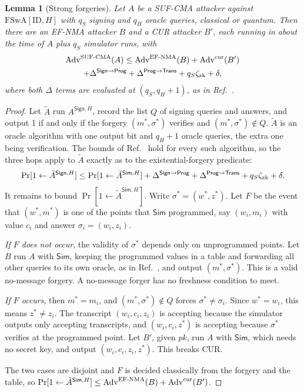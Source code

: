 \documentclass[aps,prx,reprint,superscriptaddress,nofootinbib,floatfix]{revtex4-2}
\newtheorem{lemma}{Lemma}
\theoremstyle{remark}
\newcommand{\Adv}{\mathrm{Adv}}
\newcommand{\Sign}{\textsf{Sign}}
\newcommand{\Sim}{\textsf{Sim}}
\begin{document}
\begin{lemma}[Strong forgeries]\label{lem:abstract}
Let $A$ be a SUF-CMA attacker against $\mathrm{FSwA}[\mathrm{ID},H]$ with $q_S$ signing and $q_H$ oracle queries, classical or quantum. Then there are an EF-NMA attacker $B$ and a CUR attacker $B'$, each running in about the time of $A$ plus $q_S$ simulator runs, with
\begin{multline*}
\Adv^{\rm SUF\text{-}CMA}(A)\le \Adv^{\rm EF\text{-}NMA}(B)+\Adv^{\rm cur}(B')\\
+\Delta^{\Sign\to\textsf{Prog}}+\Delta^{\textsf{Prog}\to\textsf{Trans}}+q_S\zeta_{\rm zk}+\delta,
\end{multline*}
where both $\Delta$ terms are evaluated at $(q_S,q_H+1)$, as in Ref.~\cite{fsa-fix}.
\end{lemma}
\begin{proof}
Let $\tilde A$ run $A^{\Sign,H}$, record the list $Q$ of signing queries and answers, and output 1 if and only if the forgery $(m^\ast,\sigma^\ast)$ verifies and $(m^\ast,\sigma^\ast)\notin Q$. $\tilde A$ is an oracle algorithm with one output bit and $q_H+1$ oracle queries, the extra one being verification. The bounds of Ref.~\cite{fsa-fix} hold for every such algorithm, so the three hops apply to $\tilde A$ exactly as to the existential-forgery predicate:
\[
\Pr[1\gets\tilde A^{\Sign,H}]\le\Pr[1\gets\tilde A^{\Sim,H}]+\Delta^{\Sign\to\textsf{Prog}}+\Delta^{\textsf{Prog}\to\textsf{Trans}}+q_S\zeta_{\rm zk}+\delta .
\]
It remains to bound $\Pr[1\gets\tilde A^{\Sim,H}]$. Write $\sigma^\ast=(w^\ast,z^\ast)$. Let $F$ be the event that $(w^\ast,m^\ast)$ is one of the points that $\Sim$ programmed, say $(w_i,m_i)$ with value $c_i$ and answer $\sigma_i=(w_i,z_i)$.

\emph{If $F$ does not occur}, the validity of $\sigma^\ast$ depends only on unprogrammed points. Let $B$ run $A$ with $\Sim$, keeping the programmed values in a table and forwarding all other queries to its own oracle, as in Ref.~\cite{fsa-fix}, and output $(m^\ast,\sigma^\ast)$. This is a valid no-message forgery. A no-message forger has no freshness condition to meet.

\emph{If $F$ occurs}, then $m^\ast=m_i$, and $(m^\ast,\sigma^\ast)\notin Q$ forces $\sigma^\ast\neq\sigma_i$. Since $w^\ast=w_i$, this means $z^\ast\neq z_i$. The transcript $(w_i,c_i,z_i)$ is accepting because the simulator outputs only accepting transcripts, and $(w_i,c_i,z^\ast)$ is accepting because $\sigma^\ast$ verifies at the programmed point. Let $B'$, given $\mathit{pk}$, run $A$ with $\Sim$, which needs no secret key, and output $(w_i,c_i,z_i,z^\ast)$. This breaks CUR.

The two cases are disjoint and $F$ is decided classically from the forgery and the table, so
$\Pr[1\gets\tilde A^{\Sim,H}]\le\Adv^{\rm EF\text{-}NMA}(B)+\Adv^{\rm cur}(B')$.
\end{proof}
\end{document}
